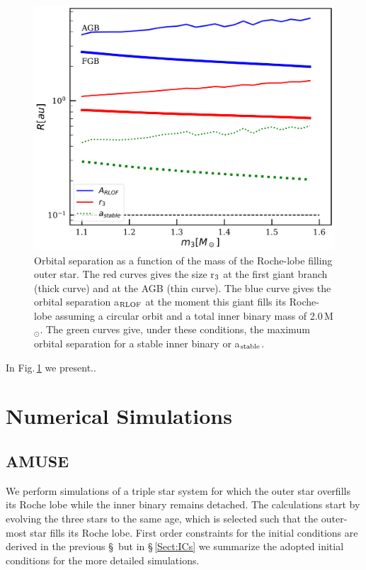\documentclass{aastex62}
\newcommand{\MSun}{\mbox{M$_\odot$}}
\begin{document}
\begin{figure}[ht!]
  \includegraphics[width=\columnwidth]{fig_minimumstablesize.pdf}
\caption{Orbital separation as a function of the mass of the
  Roche-lobe filling outer star. The red curves gives the size r$_{\rm 3}$ at the
  first giant branch (thick curve) and at the AGB (thin curve). The
  blue curve gives the orbital separation a$_{\rm RLOF}$ at the moment this giant fills its
  Roche-lobe assuming a circular orbit and a total inner binary mass
  of 2.0\,\MSun. The green curves give, under these conditions, the
  maximum orbital separation for a stable inner binary or a$_{\rm stable}$.
\label{fig:tertiarymass_vs_size}}
\end{figure}

In Fig.\,\ref{fig:tertiarymass_vs_size} we present..

\section{Numerical Simulations} \label{sims}

\subsection{AMUSE} \label{amuse}

We perform simulations of a triple star system for which the outer
star overfills its Roche lobe while the inner binary remains
detached. The calculations start by evolving the three stars to the
same age, which is selected such that the outer-most star fills its
Roche lobe.  First order constraints for the initial conditions are
derived in the previous \S\, but in \S\,\ref{Sect:ICs} we summarize
the adopted initial conditions for the more detailed simulations.
\end{document}
